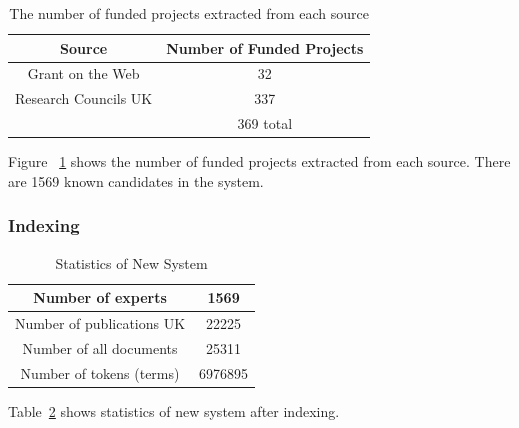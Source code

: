 \begin{table}
\centering
\begin{tabular}{|c|c|}
\hline \textbf{Source} & \textbf{Number of Funded Projects} \\
\hline Grant on the Web & 32 \\
\hline Research Councils UK & 337 \\
\hline   & 369 total \\ 
\hline
\end{tabular}
\caption{The number of funded projects extracted from each source} \label{table:stats}
\end{table}
Figure ~\ref{table:stats} shows the number of funded projects extracted from each source. There are 1569 known candidates in the system.

\subsubsection{Indexing}
\begin{table}
\centering
\begin{tabular}{|c|c|}
\hline Number of experts & 1569 \\
\hline Number of publications UK & 22225 \\
\hline Number of all documents   & 25311 \\ 
\hline Number of tokens (terms) & 6976895 \\
\hline
\end{tabular}
\caption{Statistics of New System} \label{table:newtstats}
\end{table}
Table~\ref{table:newtstats} shows statistics of new system after indexing.



